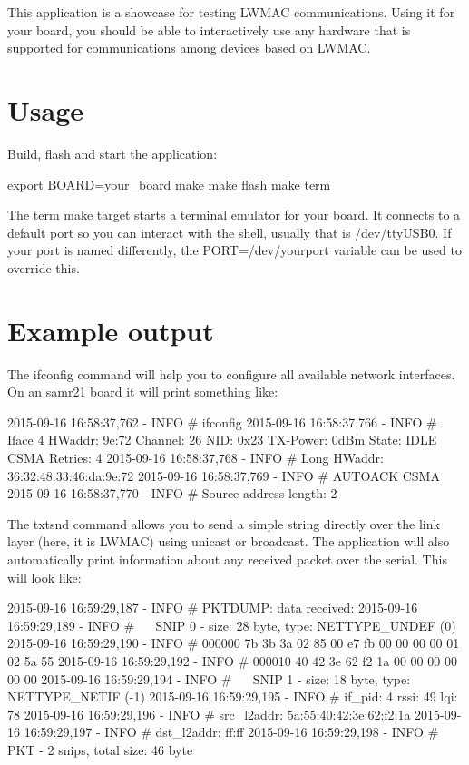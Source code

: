 This application is a showcase for testing L\+W\+M\+AC communications. Using it for your board, you should be able to interactively use any hardware that is supported for communications among devices based on L\+W\+M\+AC.

\section*{Usage }

Build, flash and start the application\+: 
\begin{DoxyCode}
export BOARD=your\_board
make
make flash
make term
\end{DoxyCode}


The {\ttfamily term} make target starts a terminal emulator for your board. It connects to a default port so you can interact with the shell, usually that is {\ttfamily /dev/tty\+U\+S\+B0}. If your port is named differently, the {\ttfamily P\+O\+RT=/dev/yourport} variable can be used to override this.

\section*{Example output }

The {\ttfamily ifconfig} command will help you to configure all available network interfaces. On an samr21 board it will print something like\+: 
\begin{DoxyCode}
2015-09-16 16:58:37,762 - INFO # ifconfig
2015-09-16 16:58:37,766 - INFO # Iface  4   HWaddr: 9e:72  Channel: 26  NID: 0x23  TX-Power: 0dBm  State:
       IDLE CSMA Retries: 4
2015-09-16 16:58:37,768 - INFO #            Long HWaddr: 36:32:48:33:46:da:9e:72
2015-09-16 16:58:37,769 - INFO #            AUTOACK  CSMA
2015-09-16 16:58:37,770 - INFO #            Source address length: 2
\end{DoxyCode}


The {\ttfamily txtsnd} command allows you to send a simple string directly over the link layer (here, it is L\+W\+M\+AC) using unicast or broadcast. The application will also automatically print information about any received packet over the serial. This will look like\+: 
\begin{DoxyCode}
2015-09-16 16:59:29,187 - INFO # PKTDUMP: data received:
2015-09-16 16:59:29,189 - INFO # ~~ SNIP  0 - size:  28 byte, type:
NETTYPE\_UNDEF (0)
2015-09-16 16:59:29,190 - INFO # 000000 7b 3b 3a 02 85 00 e7 fb 00 00 00 00 01
02 5a 55
2015-09-16 16:59:29,192 - INFO # 000010 40 42 3e 62 f2 1a 00 00 00 00 00 00
2015-09-16 16:59:29,194 - INFO # ~~ SNIP  1 - size:  18 byte, type:
NETTYPE\_NETIF (-1)
2015-09-16 16:59:29,195 - INFO # if\_pid: 4  rssi: 49  lqi: 78
2015-09-16 16:59:29,196 - INFO # src\_l2addr: 5a:55:40:42:3e:62:f2:1a
2015-09-16 16:59:29,197 - INFO # dst\_l2addr: ff:ff
2015-09-16 16:59:29,198 - INFO # ~~ PKT    -  2 snips, total size:  46 byte
\end{DoxyCode}
 